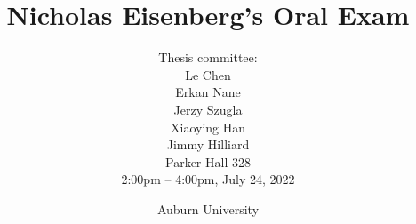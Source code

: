 


\title %
{
  Nicholas Eisenberg's Oral Exam
}


\author{ \small
  Thesis committee:\\[1em]
  \small Le Chen\\[0.5em]
 \small Erkan Nane\\[0.5em]
 \small Jerzy Szugla\\[0.5em]
 \small Xiaoying Han\\[0.5em]
 \small Jimmy Hilliard\\[3em]
  {\small Parker Hall 328}\\[1em]
  {\small 2:00pm -- 4:00pm, July 24, 2022}
}



\date[Auburn]{
  Auburn University
}


